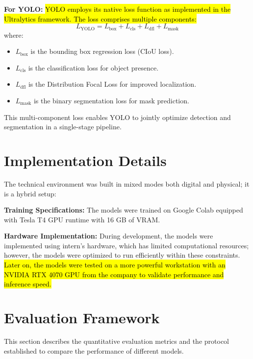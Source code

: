 \textbf{For YOLO:} \hl{YOLO employs its native loss function as implemented in the Ultralytics framework. The loss comprises multiple components:}
\begin{equation}
    L_{\text{YOLO}} = L_{\text{box}} + L_{\text{cls}} + L_{\text{dfl}} + L_{\text{mask}}
\end{equation}
where:
\begin{itemize}
    \item $L_{\text{box}}$ is the bounding box regression loss (CIoU loss).
    \item $L_{\text{cls}}$ is the classification loss for object presence.
    \item $L_{\text{dfl}}$ is the Distribution Focal Loss for improved localization.
    \item $L_{\text{mask}}$ is the binary segmentation loss for mask prediction.
\end{itemize}

This multi-component loss enables YOLO to jointly optimize detection and segmentation in a single-stage pipeline.

\section{Implementation Details}

\hs The technical environment was built in mixed modes both digital and physical; it is a hybrid setup:

\textbf{Training Specifications:} The models were trained on Google Colab equipped with Tesla T4 GPU runtime with 16 GB of VRAM.

\textbf{Hardware Implementation:} During development, the models were implemented using intern's hardware, which has limited computational resources; however, the models were optimized to run efficiently within these constraints. \hl{Later on, the models were tested on a more powerful workstation with an NVIDIA RTX 4070 GPU from the company to validate performance and inference speed.}

\section{Evaluation Framework}
This section describes the quantitative evaluation metrics and the protocol established to compare the performance of different models.

